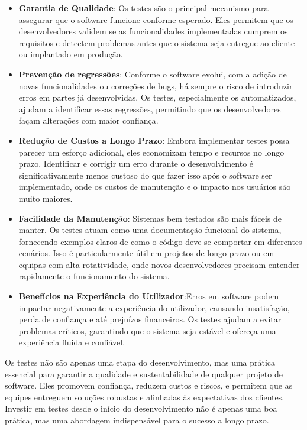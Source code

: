 \documentclass[11pt]{scrartcl} %
\begin{document}
\begin{itemize}
	\item \textbf{Garantia de Qualidade}: Os testes são o principal mecanismo para assegurar que o software funcione conforme esperado. Eles permitem que os desenvolvedores validem se as funcionalidades implementadas cumprem os requisitos e detectem problemas antes que o sistema seja entregue ao cliente ou implantado em produção.
	\item \textbf{Prevenção de regressões}: Conforme o software evolui, com a adição de novas funcionalidades ou correções de bugs, há sempre o risco de introduzir erros em partes já desenvolvidas. Os testes, especialmente os automatizados, ajudam a identificar essas regressões, permitindo que os desenvolvedores façam alterações com maior confiança.
	\item \textbf{Redução de Custos a Longo Prazo}: Embora implementar testes possa parecer um esforço adicional, eles economizam tempo e recursos no longo prazo. Identificar e corrigir um erro durante o desenvolvimento é significativamente menos custoso do que fazer isso após o software ser implementado, onde os custos de manutenção e o impacto nos usuários são muito maiores.
	\item \textbf{Facilidade da Manutenção}: Sistemas bem testados são mais fáceis de manter. Os testes atuam como uma documentação funcional do sistema, fornecendo exemplos claros de como o código deve se comportar em diferentes cenários. Isso é particularmente útil em projetos de longo prazo ou em equipas com alta rotatividade, onde novos desenvolvedores precisam entender rapidamente o funcionamento do sistema.
	\item \textbf{Benefícios na Experiência do Utilizador}:Erros em software podem impactar negativamente a experiência do utilizador, causando insatisfação, perda de confiança e até prejuízos financeiros. Os testes ajudam a evitar problemas críticos, garantindo que o sistema seja estável e ofereça uma experiência fluida e confiável.
\end{itemize}


Os testes não são apenas uma etapa do desenvolvimento, mas uma prática essencial para garantir a qualidade e sustentabilidade de qualquer projeto de software. Eles promovem confiança, reduzem custos e riscos, e permitem que as equipes entreguem soluções robustas e alinhadas às expectativas dos clientes. Investir em testes desde o início do desenvolvimento não é apenas uma boa prática, mas uma abordagem indispensável para o sucesso a longo prazo.
\end{document}
